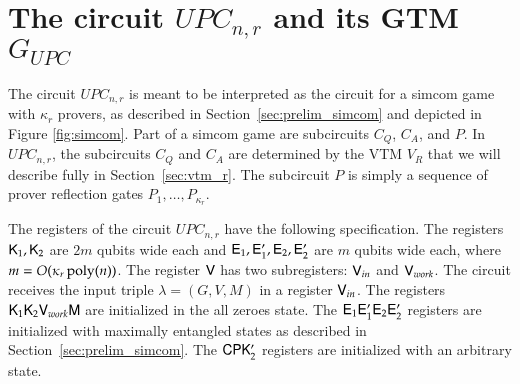 
\section{The circuit $UPC_{n,r}$ and its GTM $G_{UPC}$}
\label{sec:upc}

The circuit $UPC_{n,r}$ is meant to be interpreted as the circuit for a simcom game with $\kappa_r$ provers, as described in Section~\ref{sec:prelim_simcom} and depicted in Figure \ref{fig:simcom}. Part of a simcom game are subcircuits $C_Q$, $C_A$, and $P$. In $UPC_{n,r}$, the subcircuits $C_Q$ and $C_A$ are determined by the VTM $V_R$ that we will describe fully in Section~\ref{sec:vtm_r}. The subcircuit $P$ is simply a sequence of prover reflection gates $P_1,\ldots,P_{\kappa_r}$. %

The registers of the circuit $UPC_{n,r}$ have the following specification. The registers ${\mathsf{K}}_1, {\mathsf{K}}_2$ are $2m$ qubits wide each and ${\mathsf{E}}_1,{\mathsf{E}}_1',{\mathsf{E}}_2,{\mathsf{E}}_2'$ are $m$ qubits wide each, where $m = O(\kappa_r \operatorname{poly}(n))$. The register ${\mathsf{V}}$ has two subregisters: ${\mathsf{V}}_{in}$ and ${\mathsf{V}}_{work}$. The circuit receives the input triple $\lambda = (G,V,M)$ in a register ${\mathsf{V}}_{in}$. The registers ${\mathsf{K}}_1 {\mathsf{K}}_2 {\mathsf{V}}_{work} {\mathsf{M}}$ are initialized in the all zeroes state. The ${\mathsf{E}}_1 {\mathsf{E}}_1' {\mathsf{E}}_2 {\mathsf{E}}_2'$ registers are initialized with maximally entangled states as described in Section~\ref{sec:prelim_simcom}. The ${\mathsf{C}} {\mathsf{P}} {\mathsf{K}}_2'$ registers are initialized with an arbitrary state.




